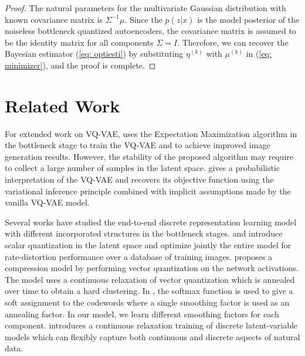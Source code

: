 \documentclass[letterpaper]{article} %
\begin{document}
\begin{proof}
	The natural parameters for the multivariate Gaussian distribution with known covariance matrix is $\Sigma^{-1}\mu$. Since the $p(z|x)$ is the model posterior of the noiseless bottleneck quantized autoencoders, the covariance matrix is assumed to be the identity matrix for all components $\Sigma = I$. Therefore, we can recover the Bayesian estimator (\ref{eq: optiesti}) by substituting $\eta^{(k)}$ with $\mu^{(k)}$ in (\ref{eq: minimizer}), and the proof is complete.
\end{proof}
\section{Related Work}
\label{Background}
For extended work on VQ-VAE, \cite{roy:18} uses the Expectation Maximization algorithm in the bottleneck stage to train the VQ-VAE and to achieve improved image generation results. However, the stability of the proposed algorithm may require to collect a large number of samples in the latent space. \cite{Henter2018} gives a probabilistic interpretation of the VQ-VAE and recovers its objective function using the variational inference principle combined with implicit assumptions made by the vanilla VQ-VAE model.

Several works have studied the end-to-end discrete representation learning model with different incorporated structures in the bottleneck stages. \cite{theis:17:iclr} and \cite{Balle:17:iclr}  introduce scalar quantization in the latent space and optimize jointly the entire model for rate-distortion performance over a database of training images. \cite{agustsson:17:nips} proposes a compression model by performing vector quantization on the network activations. The model uses a continuous relaxation of vector quantization which is annealed over time to obtain a hard clustering. In \cite{agustsson:17:nips}, the softmax function is used to give a soft assignment to the codewords where a single smoothing factor is used as an annealing factor. In our model, we learn different smoothing factors for each component. \cite{sonderbypoole2017} introduces a continuous relaxation training of discrete latent-variable models which can flexibly capture both continuous and discrete aspects of natural data.
\end{document}
